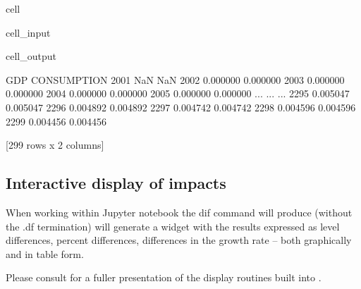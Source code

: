 \documentclass[letterpaper,10pt,english]{jupyterBook}
\begin{document}
\begin{sphinxuseclass}{cell}\begin{sphinxVerbatimInput}

\begin{sphinxuseclass}{cell_input}
\begin{sphinxVerbatim}[commandchars=\\\{\}]
\PYG{p}{[}\PYG{p}{]}
\end{sphinxVerbatim}

\end{sphinxuseclass}\end{sphinxVerbatimInput}
\begin{sphinxVerbatimOutput}

\begin{sphinxuseclass}{cell_output}
\begin{sphinxVerbatim}[commandchars=\\\{\}]
           GDP  CONSUMPTION
2001       NaN          NaN
2002  0.000000     0.000000
2003  0.000000     0.000000
2004  0.000000     0.000000
2005  0.000000     0.000000
...        ...          ...
2295  0.005047     0.005047
2296  0.004892     0.004892
2297  0.004742     0.004742
2298  0.004596     0.004596
2299  0.004456     0.004456

[299 rows x 2 columns]
\end{sphinxVerbatim}

\end{sphinxuseclass}\end{sphinxVerbatimOutput}

\end{sphinxuseclass}

\subsection{Interactive display of impacts}
\label{\detokenize{content/03_Installation/TestingModelFlow:interactive-display-of-impacts}}
\sphinxAtStartPar
When working within Jupyter notebook the dif command will produce (without the .df termination) will generate a widget with the results expressed as level differences, percent differences, differences in the growth rate – both graphically and in table form.

\sphinxAtStartPar
Please consult  for a fuller presentation of the display routines built into .
\end{document}
